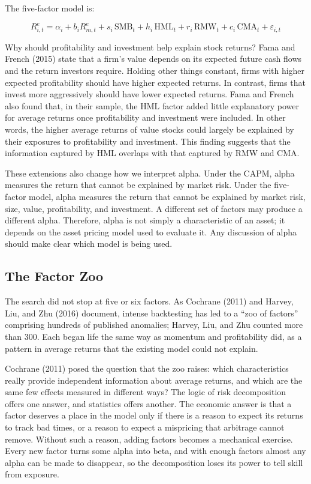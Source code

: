 The five-factor model is:

\begin{equation}
  R^{e}_{i,t} = \alpha_i + b_i R^{e}_{m,t} + s_i \,\mathrm{SMB}_t + h_i \,\mathrm{HML}_t + r_i \,\mathrm{RMW}_t + c_i \,\mathrm{CMA}_t + \varepsilon_{i,t}
  \label{eq:03-ff5}
\end{equation}

Why should profitability and investment help explain stock returns? Fama and French (2015) state that a firm's value depends on its expected future cash flows and the return investors require.
Holding other things constant, firms with higher expected profitability should have higher expected returns. In contrast, firms that invest
more aggressively should have lower expected returns. 
Fama and French also found that, in their sample, the
HML factor added little explanatory power for average returns once profitability and investment were included. In other words, the
higher average returns of value stocks could largely be explained by their exposures to profitability and investment. This finding suggests
that the information captured by HML overlaps with that captured by RMW and CMA.

These extensions also change how we interpret alpha. Under the CAPM, alpha measures the return that cannot be explained by market risk.
Under the five-factor model, alpha measures the return that cannot be explained by market risk, size, value, profitability, and investment.
A different set of factors may produce a different alpha. Therefore, alpha is not simply a characteristic of an asset; it depends on the
asset pricing model used to evaluate it. Any discussion of alpha should make clear which model is being used.

\subsection{The Factor Zoo}
\label{sec:03-zoo}
The search did not stop at five or six factors. As Cochrane (2011) and Harvey, Liu, and Zhu (2016) document, intense backtesting has led to a ``zoo of factors'' comprising hundreds of published anomalies; Harvey, Liu, and Zhu counted more than 300. Each began life the same way as momentum and profitability did, as a pattern in average returns that the existing model could not explain.

Cochrane (2011) posed the question that the zoo raises: which characteristics really provide independent information about average returns, and which are the same few effects measured in different ways? The logic of risk decomposition offers one answer, and statistics offers another. The economic answer is that a factor deserves a place in the model only if there is a reason to expect its returns to track bad times, or a reason to expect a mispricing that arbitrage cannot remove. Without such a reason, adding factors becomes a mechanical exercise. Every new factor turns some alpha into beta, and with enough factors almost any alpha can be made to disappear, so the decomposition loses its power to tell skill from exposure.

